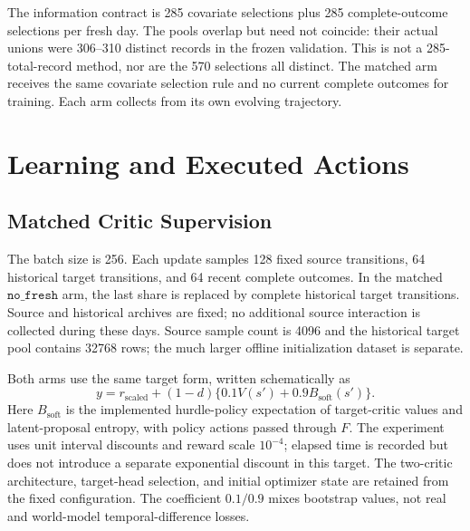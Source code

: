 \documentclass[journal]{IEEEtran}
\newcommand{\nf}{\texttt{no\_fresh}}
\begin{document}
The information contract is 285 covariate selections plus 285 complete-outcome selections per fresh day. The pools overlap but need not coincide: their actual unions were 306--310 distinct records in the frozen validation. This is not a 285-total-record method, nor are the 570 selections all distinct. The matched arm receives the same covariate selection rule and no current complete outcomes for training. Each arm collects from its own evolving trajectory.

\section{Learning and Executed Actions}
\subsection{Matched Critic Supervision}
The batch size is 256. Each update samples 128 fixed source transitions, 64 historical target transitions, and 64 recent complete outcomes. In the matched $\nf$ arm, the last share is replaced by complete historical target transitions. Source and historical archives are fixed; no additional source interaction is collected during these days. Source sample count is 4096 and the historical target pool contains 32768 rows; the much larger offline initialization dataset is separate.

Both arms use the same target form, written schematically as
\begin{equation}
 y=r_{\mathrm{scaled}}+(1-d)\{0.1V(s')+0.9B_{\mathrm{soft}}(s')\}. \label{eq:target}
\end{equation}
Here $B_{\mathrm{soft}}$ is the implemented hurdle-policy expectation of target-critic values and latent-proposal entropy, with policy actions passed through $F$. The experiment uses unit interval discounts and reward scale $10^{-4}$; elapsed time is recorded but does not introduce a separate exponential discount in this target. The two-critic architecture, target-head selection, and initial optimizer state are retained from the fixed configuration. The coefficient $0.1/0.9$ mixes bootstrap values, not real and world-model temporal-difference losses.
\end{document}
